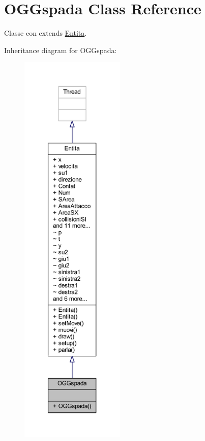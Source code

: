\hypertarget{classoggetti_1_1_o_g_gspada}{}\section{O\+G\+Gspada Class Reference}
\label{classoggetti_1_1_o_g_gspada}


Classe con extends \hyperlink{namespace_entita}{Entita}.  




Inheritance diagram for O\+G\+Gspada\+:
\nopagebreak
\begin{figure}[H]
\begin{center}
\leavevmode
\includegraphics[height=550pt]{classoggetti_1_1_o_g_gspada__inherit__graph}
\end{center}
\end{figure}


